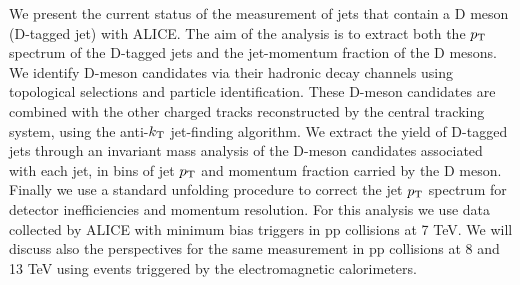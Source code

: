 \documentclass[12pt]{article}
\begin{document}
We present the current status of the measurement of jets that contain a D meson (D-tagged jet) with \mbox{ALICE}.
The aim of the analysis is to extract both the $p_{\rm T}$ spectrum of the D-tagged jets and the jet-momentum fraction of the D mesons. 
We identify D-meson candidates via their hadronic decay channels using topological selections and particle identification.
These D-meson candidates are combined with the other charged tracks reconstructed by the central tracking system, 
using the anti-$k_{\rm T}$ jet-finding algorithm.
We extract the yield of D-tagged jets through an invariant mass analysis of the D-meson candidates associated with each jet, 
in bins of jet $p_{\rm T}$ and momentum fraction carried by the D meson. Finally we use a standard unfolding procedure 
to correct the jet $p_{\rm T}$ spectrum for detector inefficiencies and momentum resolution. For this analysis we use data collected
by ALICE with minimum bias triggers in pp collisions at 7 TeV. We will discuss also
the perspectives for the same measurement in pp collisions at 8 and 13 TeV using events triggered
by the electromagnetic calorimeters.
\end{document}
